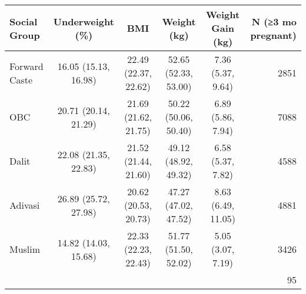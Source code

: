 \begin{tabular}{lccccr}
\toprule
Social Group & Underweight (\%) & BMI & Weight (kg) & Weight Gain (kg) & N (≥3 mo pregnant) \\
\midrule
Forward Caste&16.05 (15.13, 16.98)&22.49 (22.37, 22.62)&52.65 (52.33, 53.00)&7.36 (5.37, 9.64)&2851\\
OBC&20.71 (20.14, 21.29)&21.69 (21.62, 21.75)&50.22 (50.06, 50.40)&6.89 (5.86, 7.94)&7088\\
Dalit&22.08 (21.35, 22.83)&21.52 (21.44, 21.60)&49.12 (48.92, 49.32)&6.58 (5.37, 7.82)&4588\\
Adivasi&26.89 (25.72, 27.98)&20.62 (20.53, 20.73)&47.27 (47.02, 47.52)&8.63 (6.49, 11.05)&4881\\
Muslim&14.82 (14.03, 15.68)&22.33 (22.23, 22.43)&51.77 (51.50, 52.02)&5.05 (3.07, 7.19)&3426\\
&&&&&95\\
\bottomrule
\end{tabular}
